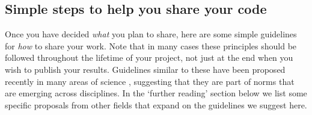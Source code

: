 \documentclass[11pt]{article}
\begin{document}
\subsection*{Simple steps to help you share your code}

Once you have decided \textit{what} you plan to share, here are some simple 
guidelines for \textit{how} to share your work.  Note that in many cases these
principles should be followed throughout the lifetime of your project,
not just at the end when you wish to publish your results. Guidelines similar to these have been proposed recently in many areas of science \cite{Nosek2015, miguel2014, stodden2012journals}, suggesting that they are part of norms that are emerging across disciplines. In the `further reading' section below we list some specific proposals from other fields that expand on the guidelines we suggest here.  
\end{document}
